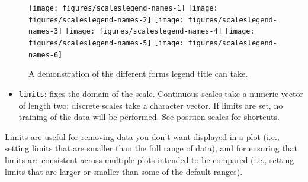 \begin{Shaded}
\begin{Highlighting}[]
\StringTok{ }  
\StringTok{ }\NormalTok{(}\NormalTok{)}
\StringTok{ }\NormalTok{(}\NormalTok{)}
\StringTok{ }\NormalTok{(}\NormalTok{)}
\StringTok{ }\NormalTok{(} \NormalTok{, } \NormalTok{, } \NormalTok{)}
\StringTok{ }\NormalTok{(}\NormalTok{(}
\end{Highlighting}
\end{Shaded}

\begin{figure}

{\centering \texttt{[image: figures/scaleslegend-names-1]} \texttt{[image: figures/scaleslegend-names-2]} \texttt{[image: figures/scaleslegend-names-3]} \texttt{[image: figures/scaleslegend-names-4]} \texttt{[image: figures/scaleslegend-names-5]} \texttt{[image: figures/scaleslegend-names-6]} 

}

\caption{A demonstration of the different forms legend title can take.\label{fig:legend-names}}
\end{figure}

\begin{itemize}
\itemsep1pt\parskip0pt
\item
  \texttt{limits}: fixes the domain of the scale. Continuous scales take
  a numeric vector of length two; discrete scales take a character
  vector. If limits are set, no training of the data will be performed.
  See \hyperref[sub:scale-position]{position scales} for shortcuts.
   
\end{itemize}

Limits are useful for removing data you don't want displayed in a plot
(i.e., setting limits that are smaller than the full range of data), and
for ensuring that limits are consistent across multiple plots intended
to be compared (i.e., setting limits that are larger or smaller than
some of the default ranges).

